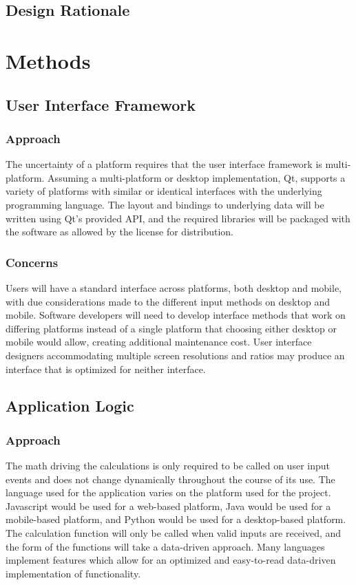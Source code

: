 \documentclass[onecolumn, draftclsnofoot,10pt, compsoc]{IEEEtran}
\begin{document}
\subsection{Design Rationale}

\section{Methods}

\subsection{User Interface Framework}
\subsubsection{Approach}
The uncertainty of a platform requires that the user interface framework is multi-platform.
Assuming a multi-platform or desktop implementation, Qt, supports a variety of platforms with similar or identical interfaces with the underlying programming language.
The layout and bindings to underlying data will be written using Qt's provided API, and the required libraries will be packaged with the software as allowed by the license for distribution. 
\subsubsection{Concerns}
Users will have a standard interface across platforms, both desktop and mobile, with due considerations made to the different input methods on desktop and mobile.
Software developers will need to develop interface methods that work on differing platforms instead of a single platform that choosing either desktop or mobile would allow, creating additional maintenance cost.
User interface designers accommodating multiple screen resolutions and ratios may produce an interface that is optimized for neither interface.
\subsection{Application Logic}
\subsubsection{Approach}
The math driving the calculations is only required to be called on user input events and does not change dynamically throughout the course of its use.
The language used for the application varies on the platform used for the project.
Javascript would be used for a web-based platform, Java would be used for a mobile-based platform, and Python would be used for a desktop-based platform.
The calculation function will only be called when valid inputs are received, and the form of the functions will take a data-driven approach.
Many languages implement features which allow for an optimized and easy-to-read data-driven implementation of functionality.
\end{document}
